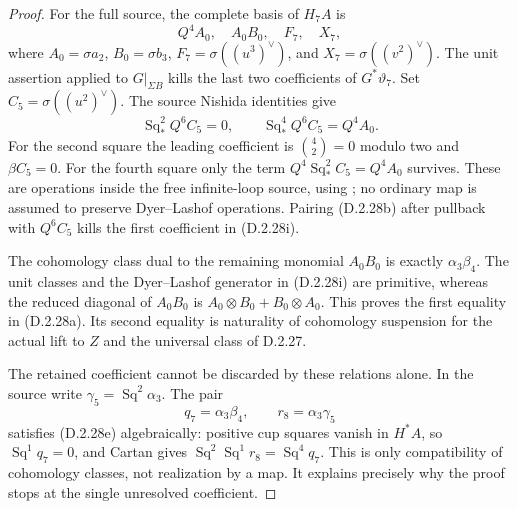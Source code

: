 \begin{proof}
For the full source, the complete basis of $H_7A$ is
\[
 Q^4A_0,\quad A_0B_0,\quad F_7,\quad X_7,
 \tag{D.2.28i}
\]
where $A_0=\sigma a_2$, $B_0=\sigma b_3$,
$F_7=\sigma((u^3)^\vee)$, and
$X_7=\sigma((v^2)^\vee)$.
The unit assertion applied to $G|_{\Sigma B}$ kills
the last two coefficients of $G^*\vartheta_7$.
Set $C_5=\sigma((u^2)^\vee)$.
The source Nishida identities give
\[
 \operatorname{Sq}_*^2Q^6C_5=0,
 \qquad
 \operatorname{Sq}_*^4Q^6C_5=Q^4A_0.
 \tag{D.2.28j}
\]
For the second square the leading coefficient is
$\binom42=0$ modulo two and $\beta C_5=0$.
For the fourth square only the term
$Q^4\operatorname{Sq}_*^2C_5=Q^4A_0$ survives.
These are operations inside the free infinite-loop source,
using \cite[Chapters I and III]{I_CohenLadaMay1976};
no ordinary map is assumed to preserve Dyer--Lashof operations.
Pairing \textup{(D.2.28b)} after pullback with $Q^6C_5$
kills the first coefficient in \textup{(D.2.28i)}.

The cohomology class dual to the remaining monomial $A_0B_0$
is exactly $\alpha_3\beta_4$. The unit classes and the
Dyer--Lashof generator in \textup{(D.2.28i)} are primitive,
whereas the reduced diagonal of $A_0B_0$ is
$A_0\otimes B_0+B_0\otimes A_0$.
This proves the first equality in \textup{(D.2.28a)}.
Its second equality is naturality of cohomology suspension
for the actual lift to $Z$ and the universal class of
\textup{D.2.27}.

The retained coefficient cannot be discarded by these
relations alone. In the source write
$\gamma_5=\operatorname{Sq}^2\alpha_3$.
The pair
\[
 q_7=\alpha_3\beta_4,
       \qquad r_8=\alpha_3\gamma_5
 \tag{D.2.28k}
\]
satisfies \textup{(D.2.28e)} algebraically: positive cup
squares vanish in $H^*A$, so
$\operatorname{Sq}^1q_7=0$, and Cartan gives
$\operatorname{Sq}^2\operatorname{Sq}^1r_8
=\operatorname{Sq}^4q_7$.
This is only compatibility of cohomology classes, not
realization by a map. It explains precisely why the
proof stops at the single unresolved coefficient.
\end{proof}
